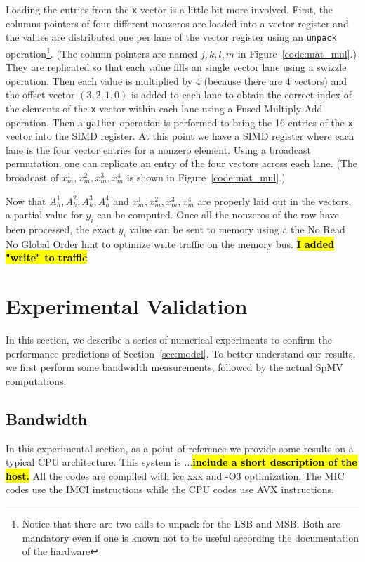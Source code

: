\documentclass[10pt,conference,compsocconf]{IEEEtran}
\newcommand{\todo}[1]{{\color{red}\textbf{\hl{#1}}\xspace}}
\begin{document}
Loading the entries from the {\tt x} vector is a little bit more
involved. First, the columns pointers of four different nonzeros are
loaded into a vector register and the values are distributed one per
lane of the vector register using an {\tt unpack}
operation\footnote{Notice that there are two calls to unpack for the
  LSB and MSB. Both are mandatory even if one is known not to be
  useful according the documentation of the hardware}. (The column
pointers are named $j,k,l,m$ in Figure~\ref{code:mat_mul}.) They
are replicated so that each value fills an single vector lane 
using a swizzle operation. Then each value is multiplied by 4 
(because there are 4 vectors) 
and the offset vector $(3,2,1,0)$ is added to each lane to obtain the
correct index of the elements of the {\tt x} vector within each lane
using a Fused Multiply-Add operation. Then a {\tt gather} operation is
performed to bring the 16 entries of the {\tt x} vector into the SIMD
register. At this point we have a SIMD register where each lane is the
four vector entries for a nonzero element. Using a broadcast
permutation, one can replicate an entry of the four vectors across
each lane. (The broadcast of $x_m^1,x_m^2,x_m^3,x_m^4$ is shown in
Figure~\ref{code:mat_mul}.)

Now that $A_h^1,A_h^2,A_h^3,A_h^4$ and $x_m^1,x_m^2,x_m^3,x_m^4$ are
properly laid out in the vectors, a partial value for $y_i$ can be
computed. Once all the nonzeros of the row have been processed, the
exact $y_i$ value can be sent to memory using a the No Read No Global
Order hint to optimize write traffic on the memory bus.
\todo{I added "write" to traffic }


\section{Experimental Validation}
\label{sec:expe}
In this section, we describe a series of numerical experiments to
confirm the performance predictions of Section~\ref{sec:model}. To
better understand our results, we first perform some bandwidth
measurements, followed by the actual SpMV computations.


\subsection{Bandwidth}

In this experimental section, as a point of reference we provide some
results on a typical CPU architecture. This system is ...\todo{include
  a short description of the host.}  All the codes are compiled with
icc xxx and -O3 optimization. The MIC codes use the IMCI instructions
while the CPU codes use AVX instructions.
\end{document}
